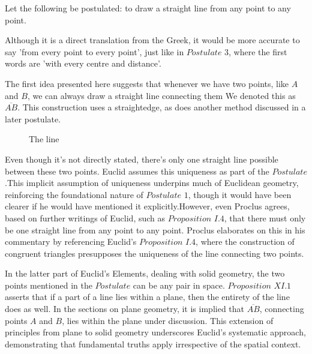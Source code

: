 \begin{post}
Let the following be postulated: to draw a straight line from any point to any point.
\end{post}

Although it is a direct translation from the Greek, it would be more accurate to say 'from every point to every point', just like in $\textit{Postulate 3}$, where the first words are 'with every centre and distance'.

The first idea presented here suggests that whenever we have two points, like $A$ and $B$, we can always draw a straight line connecting them We denoted this as $\overline{AB}$. This construction uses a straightedge, as does another method discussed in a later postulate.

\begin{figure}[H]
\centering
	\caption{The line}
\end{figure}

Even though it's not directly stated, there's only one straight line possible between these two points. Euclid assumes this uniqueness as part of the $\textit{Postulate}$.This implicit assumption of uniqueness underpins much of Euclidean geometry, reinforcing the foundational nature of $\textit{Postulate 1}$, though it would have been clearer if he would have mentioned it explicitly.However, even Proclus agrees, based on further writings of Euclid, such as $\textit{Proposition I.4}$, that there must only be one straight line from any point to any point. Proclus elaborates on this in his commentary by referencing Euclid's $\textit{Proposition I.4}$, where the construction of congruent triangles presupposes the uniqueness of the line connecting two points.

In the latter part of Euclid's Elements, dealing with solid geometry, the two points mentioned in the $\textit{Postulate}$ can be any pair in space. $\textit{Proposition XI.1}$ asserts that if a part of a line lies within a plane, then the entirety of the line does as well. In the sections on plane geometry, it is implied that $\overline{AB}$, connecting points $A$ and $B$, lies within the plane under discussion. This extension of principles from plane to solid geometry underscores Euclid’s systematic approach, demonstrating that fundamental truths apply irrespective of the spatial context.

\clearpage